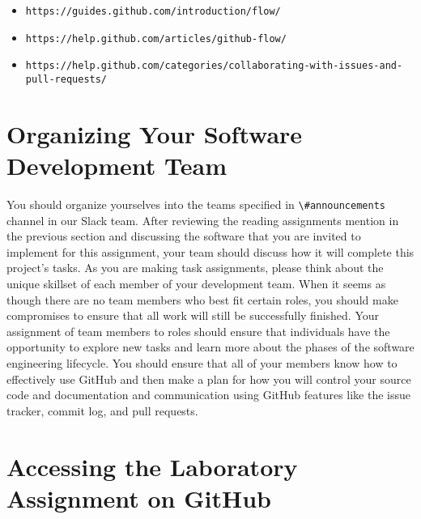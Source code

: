 \documentclass[11pt]{article}
\newcommand{\url}[1]{\lstinline{#1}}
\newcommand{\channel}[1]{\lstinline{#1}}
\begin{document}
\vspace*{-.5em}

\begin{itemize}
  \setlength{\itemsep}{0pt}
  \item \url{https://guides.github.com/introduction/flow/}
  \item \url{https://help.github.com/articles/github-flow/}
  \item \url{https://help.github.com/categories/collaborating-with-issues-and-pull-requests/}
\end{itemize}

\vspace*{-1em}

\section*{Organizing Your Software Development Team}

You should organize yourselves into the teams specified in \channel{\#announcements} channel in our Slack team. After
reviewing the reading assignments mention in the previous section and discussing the software that you are invited to
implement for this assignment, your team should discuss how it will complete this project's tasks. As you are making
task assignments, please think about the unique skillset of each member of your development team. When it seems as
though there are no team members who best fit certain roles, you should make compromises to ensure that all work will
still be successfully finished. Your assignment of team members to roles should ensure that individuals have the
opportunity to explore new tasks and learn more about the phases of the software engineering lifecycle. You should
ensure that all of your members know how to effectively use GitHub and then make a plan for how you will control your
source code and documentation and communication using GitHub features like the issue tracker, commit log, and pull
requests.

\section*{Accessing the Laboratory Assignment on GitHub}
\end{document}
